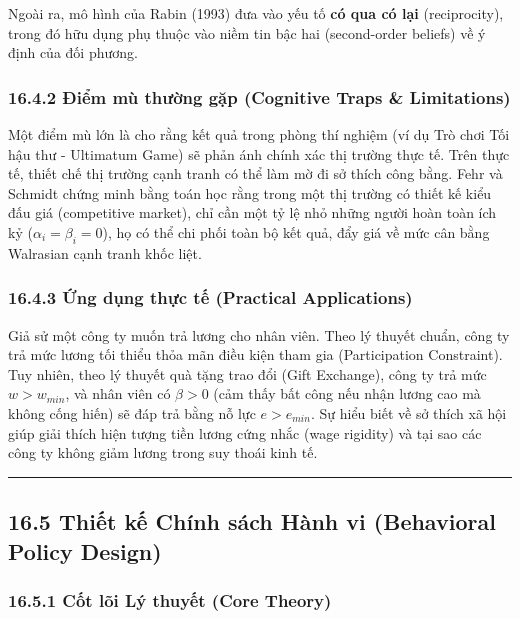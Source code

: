 \documentclass[
]{article}
\begin{document}
Ngoài ra, mô hình của Rabin (1993) đưa vào yếu tố \textbf{có qua có lại}
(reciprocity), trong đó hữu dụng phụ thuộc vào niềm tin bậc hai
(second-order beliefs) về ý định của đối phương.

\subsubsection{16.4.2 Điểm mù thường gặp (Cognitive Traps \&
Limitations)}\label{ux111iux1ec3m-muxf9-thux1b0ux1eddng-gux1eb7p-cognitive-traps-limitations-114}

Một điểm mù lớn là cho rằng kết quả trong phòng thí nghiệm (ví dụ Trò
chơi Tối hậu thư - Ultimatum Game) sẽ phản ánh chính xác thị trường thực
tế. Trên thực tế, thiết chế thị trường cạnh tranh có thể làm mờ đi sở
thích công bằng. Fehr và Schmidt chứng minh bằng toán học rằng trong một
thị trường có thiết kế kiểu đấu giá (competitive market), chỉ cần một tỷ
lệ nhỏ những người hoàn toàn ích kỷ (\(\alpha_i = \beta_i = 0\)), họ có
thể chi phối toàn bộ kết quả, đẩy giá về mức cân bằng Walrasian cạnh
tranh khốc liệt.

\subsubsection{16.4.3 Ứng dụng thực tế (Practical
Applications)}\label{ux1ee9ng-dux1ee5ng-thux1ef1c-tux1ebf-practical-applications-70}

Giả sử một công ty muốn trả lương cho nhân viên. Theo lý thuyết chuẩn,
công ty trả mức lương tối thiểu thỏa mãn điều kiện tham gia
(Participation Constraint). Tuy nhiên, theo lý thuyết quà tặng trao đổi
(Gift Exchange), công ty trả mức \(w > w_{min}\), và nhân viên có
\(\beta > 0\) (cảm thấy bất công nếu nhận lương cao mà không cống hiến)
sẽ đáp trả bằng nỗ lực \(e > e_{min}\). Sự hiểu biết về sở thích xã hội
giúp giải thích hiện tượng tiền lương cứng nhắc (wage rigidity) và tại
sao các công ty không giảm lương trong suy thoái kinh tế.

\begin{center}\rule{0.5\linewidth}{0.5pt}\end{center}

\subsection{16.5 Thiết kế Chính sách Hành vi (Behavioral Policy
Design)}\label{thiux1ebft-kux1ebf-chuxednh-suxe1ch-huxe0nh-vi-behavioral-policy-design}

\subsubsection{16.5.1 Cốt lõi Lý thuyết (Core
Theory)}\label{cux1ed1t-luxf5i-luxfd-thuyux1ebft-core-theory-64}
\end{document}
